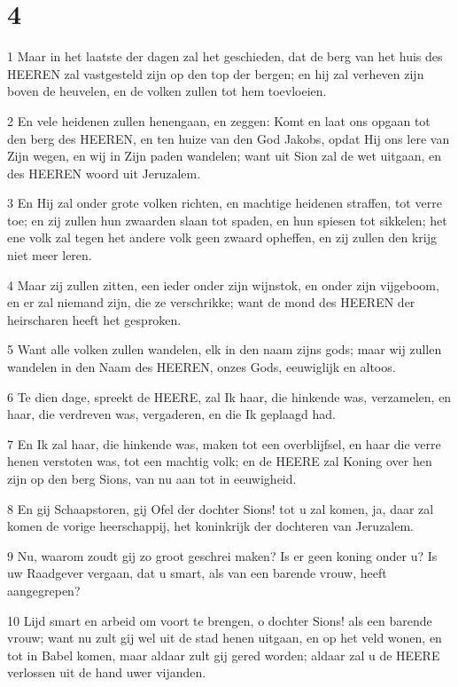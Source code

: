 \chapter{4}

\par 1 Maar in het laatste der dagen zal het geschieden, dat de berg van het huis des HEEREN zal vastgesteld zijn op den top der bergen; en hij zal verheven zijn boven de heuvelen, en de volken zullen tot hem toevloeien.
\par 2 En vele heidenen zullen henengaan, en zeggen: Komt en laat ons opgaan tot den berg des HEEREN, en ten huize van den God Jakobs, opdat Hij ons lere van Zijn wegen, en wij in Zijn paden wandelen; want uit Sion zal de wet uitgaan, en des HEEREN woord uit Jeruzalem.
\par 3 En Hij zal onder grote volken richten, en machtige heidenen straffen, tot verre toe; en zij zullen hun zwaarden slaan tot spaden, en hun spiesen tot sikkelen; het ene volk zal tegen het andere volk geen zwaard opheffen, en zij zullen den krijg niet meer leren.
\par 4 Maar zij zullen zitten, een ieder onder zijn wijnstok, en onder zijn vijgeboom, en er zal niemand zijn, die ze verschrikke; want de mond des HEEREN der heirscharen heeft het gesproken.
\par 5 Want alle volken zullen wandelen, elk in den naam zijns gods; maar wij zullen wandelen in den Naam des HEEREN, onzes Gods, eeuwiglijk en altoos.
\par 6 Te dien dage, spreekt de HEERE, zal Ik haar, die hinkende was, verzamelen, en haar, die verdreven was, vergaderen, en die Ik geplaagd had.
\par 7 En Ik zal haar, die hinkende was, maken tot een overblijfsel, en haar die verre henen verstoten was, tot een machtig volk; en de HEERE zal Koning over hen zijn op den berg Sions, van nu aan tot in eeuwigheid.
\par 8 En gij Schaapstoren, gij Ofel der dochter Sions! tot u zal komen, ja, daar zal komen de vorige heerschappij, het koninkrijk der dochteren van Jeruzalem.
\par 9 Nu, waarom zoudt gij zo groot geschrei maken? Is er geen koning onder u? Is uw Raadgever vergaan, dat u smart, als van een barende vrouw, heeft aangegrepen?
\par 10 Lijd smart en arbeid om voort te brengen, o dochter Sions! als een barende vrouw; want nu zult gij wel uit de stad henen uitgaan, en op het veld wonen, en tot in Babel komen, maar aldaar zult gij gered worden; aldaar zal u de HEERE verlossen uit de hand uwer vijanden.
